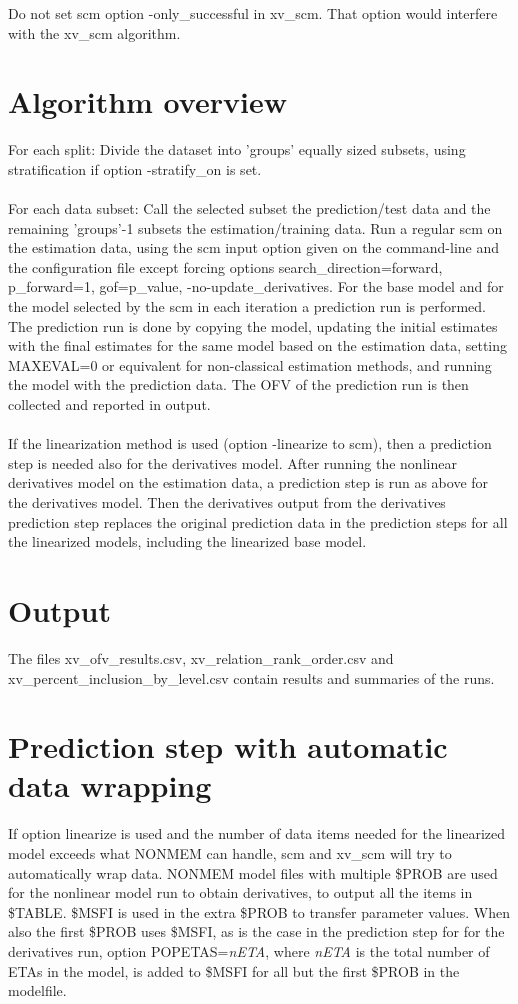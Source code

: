\documentclass[a4paper,12pt]{article}
\begin{document}
Do not set scm option -only\_successful in xv\_scm. That option would interfere with the xv\_scm algorithm.


\section{Algorithm overview}

For each split: Divide the dataset into 'groups' equally sized subsets, using stratification if option -stratify\_on is set.
\\
\\
For each data subset: Call the selected subset the prediction/test data and the remaining 'groups'-1 subsets the estimation/training data. Run a regular scm on the estimation data, using the scm input option given on the command-line and the configuration file except forcing options search\_direction=forward, p\_forward=1,  gof=p\_value, -no-update\_derivatives. For the base model and for the model selected by the scm in each iteration a  prediction run is performed. The prediction run is  done by copying the model, updating the initial estimates with the final estimates for the same model based on the estimation data, setting MAXEVAL=0 or equivalent for non-classical estimation methods, and running the model with the prediction data. The OFV of the prediction run is then collected and reported in output.
\\
\\
If the linearization method is used (option -linearize to scm), then a prediction step is needed also for the derivatives model. After running the nonlinear derivatives model on the estimation data, a prediction step is run as above for the derivatives model. Then the derivatives output from the derivatives prediction step replaces the original prediction data in the prediction steps for all the linearized models, including the linearized base model.

\section{Output}
The files xv\_ofv\_results.csv,  xv\_relation\_rank\_order.csv and xv\_percent\_inclusion\_by\_level.csv contain results and summaries of the runs.

\section{Prediction step with automatic data wrapping}

If option linearize is used and the number of data items needed for the linearized model exceeds what NONMEM can handle, scm and xv\_scm will try to automatically wrap data. NONMEM model files with multiple \$PROB are used for the nonlinear model run to obtain derivatives, to output all the items in \$TABLE. \$MSFI is used in the extra \$PROB to transfer parameter values. When also the first \$PROB uses \$MSFI, as is the case in the prediction step for for the derivatives run, option POPETAS=\emph{nETA}, where \emph{nETA} is the total number of ETAs in the model, is added to \$MSFI for all but the first \$PROB in the modelfile.
\end{document}
